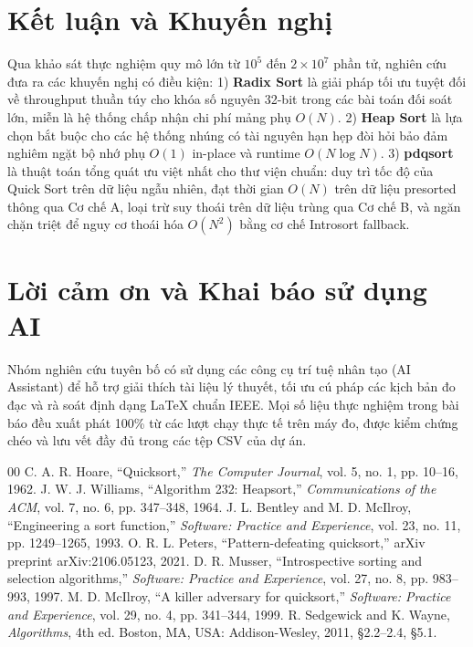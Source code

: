 \documentclass[conference]{IEEEtran}
\begin{document}
\section{Kết luận và Khuyến nghị}
Qua khảo sát thực nghiệm quy mô lớn từ $10^5$ đến $2\times 10^7$ phần tử, nghiên cứu đưa ra các khuyến nghị có điều kiện:
1) \textbf{Radix Sort} là giải pháp tối ưu tuyệt đối về throughput thuần túy cho khóa số nguyên 32-bit trong các bài toán đối soát lớn, miễn là hệ thống chấp nhận chi phí mảng phụ $O(N)$.
2) \textbf{Heap Sort} là lựa chọn bắt buộc cho các hệ thống nhúng có tài nguyên hạn hẹp đòi hỏi bảo đảm nghiêm ngặt bộ nhớ phụ $O(1)$ in-place và runtime $O(N \log N)$.
3) \textbf{pdqsort} là thuật toán tổng quát ưu việt nhất cho thư viện chuẩn: duy trì tốc độ của Quick Sort trên dữ liệu ngẫu nhiên, đạt thời gian $O(N)$ trên dữ liệu presorted thông qua Cơ chế A, loại trừ suy thoái trên dữ liệu trùng qua Cơ chế B, và ngăn chặn triệt để nguy cơ thoái hóa $O(N^2)$ bằng cơ chế Introsort fallback.

\section*{Lời cảm ơn và Khai báo sử dụng AI}
Nhóm nghiên cứu tuyên bố có sử dụng các công cụ trí tuệ nhân tạo (AI Assistant) để hỗ trợ giải thích tài liệu lý thuyết, tối ưu cú pháp các kịch bản đo đạc và rà soát định dạng LaTeX chuẩn IEEE. Mọi số liệu thực nghiệm trong bài báo đều xuất phát 100\% từ các lượt chạy thực tế trên máy đo, được kiểm chứng chéo và lưu vết đầy đủ trong các tệp CSV của dự án.

\begin{thebibliography}{00}
 C. A. R. Hoare, ``Quicksort,'' \emph{The Computer Journal}, vol. 5, no. 1, pp. 10--16, 1962.
 J. W. J. Williams, ``Algorithm 232: Heapsort,'' \emph{Communications of the ACM}, vol. 7, no. 6, pp. 347--348, 1964.
 J. L. Bentley and M. D. McIlroy, ``Engineering a sort function,'' \emph{Software: Practice and Experience}, vol. 23, no. 11, pp. 1249--1265, 1993.
 O. R. L. Peters, ``Pattern-defeating quicksort,'' arXiv preprint arXiv:2106.05123, 2021.
 D. R. Musser, ``Introspective sorting and selection algorithms,'' \emph{Software: Practice and Experience}, vol. 27, no. 8, pp. 983--993, 1997.
 M. D. McIlroy, ``A killer adversary for quicksort,'' \emph{Software: Practice and Experience}, vol. 29, no. 4, pp. 341--344, 1999.
 R. Sedgewick and K. Wayne, \emph{Algorithms}, 4th ed. Boston, MA, USA: Addison-Wesley, 2011, \S2.2--2.4, \S5.1.
\end{thebibliography}
\end{document}
